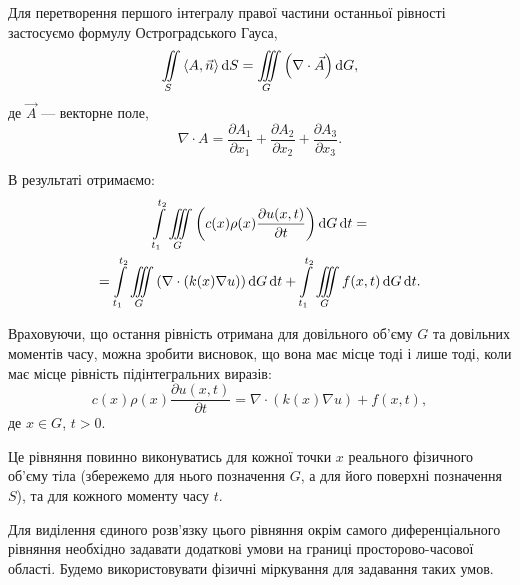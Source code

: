 Для перетворення першого інтегралу правої частини останньої рівності застосуємо формулу Остроградського Гауса, 
\begin{equation}
	\Iint_S \langle A, \vec n \rangle \diff S = \Iiint_G \Big(\nabla \cdot \vec A\Big) \diff G,
\end{equation}
де $\vec A$ --- векторне поле,
\begin{equation}
	\nabla \cdot A = \frac{\partial A_1}{\partial x_1} + \frac{\partial A_2}{\partial x_2} + \frac{\partial A_3}{\partial x_3}.
\end{equation}

В результаті отримаємо:
\begin{multline}
	\displaystyle\int\limits_{t_1}^{t_2} \displaystyle\iiint\limits_G \left( c(x)\rho(x) \frac{\partial u(x, t)}{\partial t} \right) \mathop{}\!\mathrm{d} G \mathop{}\!\mathrm{d} t = \\
	= \displaystyle\int\limits_{t_1}^{t_2} \displaystyle\iiint\limits_G \left( \nabla \cdot (k(x) \nabla u) \right) \mathop{}\!\mathrm{d} G \mathop{}\!\mathrm{d} t + \displaystyle\int\limits_{t_1}^{t_2} \displaystyle\iiint\limits_G f(x, t) \mathop{}\!\mathrm{d} G \mathop{}\!\mathrm{d} t.
\end{multline}

Враховуючи, що остання рівність отримана для довільного об'єму $G$ та довільних моментів часу, можна зробити висновок, що вона має місце тоді і лише тоді, коли має місце рівність підінтегральних виразів:
\begin{equation}
	\label{eq:thermal-energy-is-const}
	c(x) \rho(x) \frac{\partial u(x, t)}{\partial t} =\nabla\cdot (k(x) \nabla u) + f(x, t),
\end{equation}
де $x \in G$, $t > 0$. \medskip

Це рівняння повинно виконуватись для кожної точки $x$ реального фізичного об'єму тіла (збережемо для нього позначення $G$, а для його поверхні позначення $S$), та для кожного моменту часу $t$. \medskip

Для виділення єдиного розв'язку цього рівняння окрім самого диференціального рівняння необхідно задавати додаткові умови на границі просторово-часової області. Будемо використовувати фізичні міркування для задавання таких умов.

